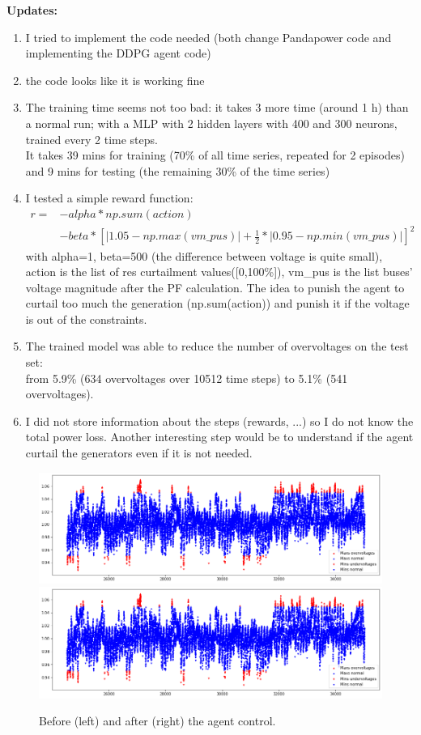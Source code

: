 \noindent \textbf{Updates:}
\begin{enumerate}
    \item I tried to implement the code needed (both change Pandapower code and implementing the DDPG agent code)
    \item the code looks like it is working fine
    \item The training time seems not too bad: it takes 3 more time (around 1 h) than a normal run; with a MLP with 2 hidden layers with 400 and 300 neurons, trained every 2 time steps.\\
    It takes 39 mins for training (70\% of all time series, repeated for 2 episodes) and 9 mins for testing (the remaining 30\% of the time series)
    \item I tested a simple reward function:
    \begin{align*}
        r = &- alpha * np.sum(action) \\
            &- beta*[|1.05-np.max(vm\_pus)|+\frac{1}{2}*|0.95-np.min(vm\_pus)|]^2
    \end{align*}
    with alpha=1, beta=500 (the difference between voltage is quite small), action is the list of res curtailment values([0,100\%]), vm\_pus is the list buses' voltage magnitude after the PF calculation. The idea to punish the agent to curtail too much the generation (np.sum(action)) and punish it if the voltage is out of the constraints.
    \item The trained model was able to reduce the number of overvoltages on the test set:\\
    from 5.9\% (634 overvoltages over 10512 time steps) to 5.1\% (541 overvoltages). 
    \item I did not store information about the steps (rewards, ...) so I do not know the total power loss. Another interesting step would be to understand if the agent curtail the generators even if it is not needed. 
\end{enumerate}


\begin{figure}[H]
\centering
    \includegraphics[width=.45\linewidth]{images/RL/before.png}
    \includegraphics[width=.45\linewidth]{images/RL/after.png}
\caption{Before (left) and after (right) the agent control. }

 \end{figure}